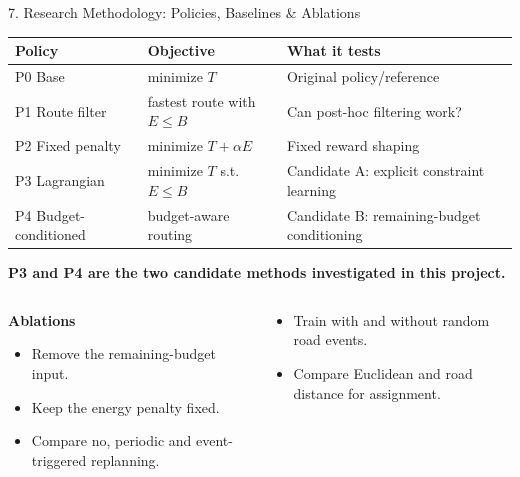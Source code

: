 \documentclass[aspectratio=169,10pt]{beamer}
\begin{document}
\begin{frame}{7. Research Methodology: Policies, Baselines \& Ablations}
\scriptsize
\centering
\renewcommand{\arraystretch}{1.18}
\begin{tabular}{P{3.2cm}P{4.2cm}P{6.0cm}}
\toprule
\textbf{Policy} & \textbf{Objective} & \textbf{What it tests}\\
\midrule
P0 Base & minimize $T$ & Original policy/reference\\
P1 Route filter & fastest route with $E\le B$ & Can post-hoc filtering work?\\
P2 Fixed penalty & minimize $T+\alpha E$ & Fixed reward shaping\\
P3 Lagrangian & minimize $T$ s.t.\ $E\le B$ & Candidate A: explicit constraint learning\\
P4 Budget-conditioned & budget-aware routing & Candidate B: remaining-budget conditioning\\
\bottomrule
\end{tabular}
\vspace{1.5mm}
\textbf{P3 and P4 are the two candidate methods investigated in this project.}
\vspace{1mm}
\begin{columns}[T]
\begin{column}{0.49\textwidth}
\textbf{Ablations}
\begin{itemize}\setlength{\itemsep}{0.4mm}
  \item Remove the remaining-budget input.
  \item Keep the energy penalty fixed.
  \item Compare no, periodic and event-triggered replanning.
\end{itemize}
\end{column}
\begin{column}{0.49\textwidth}
\vspace{3mm}
\begin{itemize}\setlength{\itemsep}{0.4mm}
  \item Train with and without random road events.
  \item Compare Euclidean and road distance for assignment.
\end{itemize}
\end{column}
\end{columns}
\end{frame}
\end{document}
